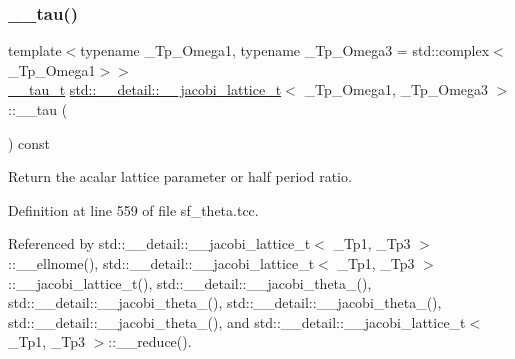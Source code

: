 \mbox{\label{structstd_1_1____detail_1_1____jacobi__lattice__t_a53604ddbd063b9d71760a0edd7b57e2b}} 
\subsubsection{\texorpdfstring{\+\_\+\+\_\+tau()}{\_\_tau()}}
{\footnotesize\ttfamily template$<$typename \+\_\+\+Tp\+\_\+\+Omega1, typename \+\_\+\+Tp\+\_\+\+Omega3 = std\+::complex$<$\+\_\+\+Tp\+\_\+\+Omega1$>$$>$ \\
\hyperlink{structstd_1_1____detail_1_1____jacobi__lattice__t_1_1____tau__t}{\+\_\+\+\_\+tau\+\_\+t} \hyperlink{structstd_1_1____detail_1_1____jacobi__lattice__t}{std\+::\+\_\+\+\_\+detail\+::\+\_\+\+\_\+jacobi\+\_\+lattice\+\_\+t}$<$ \+\_\+\+Tp\+\_\+\+Omega1, \+\_\+\+Tp\+\_\+\+Omega3 $>$\+::\+\_\+\+\_\+tau (\begin{DoxyParamCaption}{ }\end{DoxyParamCaption}) const\hspace{0.3cm}{\ttfamily [inline]}}



Return the acalar lattice parameter or half period ratio. 



Definition at line 559 of file sf\+\_\+theta.\+tcc.



Referenced by std\+::\+\_\+\+\_\+detail\+::\+\_\+\+\_\+jacobi\+\_\+lattice\+\_\+t$<$ \+\_\+\+Tp1, \+\_\+\+Tp3 $>$\+::\+\_\+\+\_\+ellnome(), std\+::\+\_\+\+\_\+detail\+::\+\_\+\+\_\+jacobi\+\_\+lattice\+\_\+t$<$ \+\_\+\+Tp1, \+\_\+\+Tp3 $>$\+::\+\_\+\+\_\+jacobi\+\_\+lattice\+\_\+t(), std\+::\+\_\+\+\_\+detail\+::\+\_\+\+\_\+jacobi\+\_\+theta\+\_(), std\+::\+\_\+\+\_\+detail\+::\+\_\+\+\_\+jacobi\+\_\+theta\+\_(), std\+::\+\_\+\+\_\+detail\+::\+\_\+\+\_\+jacobi\+\_\+theta\+\_(), std\+::\+\_\+\+\_\+detail\+::\+\_\+\+\_\+jacobi\+\_\+theta\+\_(), and std\+::\+\_\+\+\_\+detail\+::\+\_\+\+\_\+jacobi\+\_\+lattice\+\_\+t$<$ \+\_\+\+Tp1, \+\_\+\+Tp3 $>$\+::\+\_\+\+\_\+reduce().



